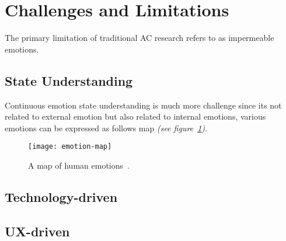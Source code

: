 \section{Challenges and Limitations}\label{sec:challenges}

The primary limitation of traditional AC research refers to as impermeable emotions.

\cite{Picard2003}

\subsection{State Understanding}

Continuous emotion state understanding is much more challenge since its not related to external emotion but also related to internal emotions, various emotions can be expressed as follows map \textit{(see figure~\ref{fig:emotions})}.

\begin{figure}[htb]
    \centering
    \texttt{[image: emotion-map]}
    \caption{A map of human emotions~\cite{emotionmap}.}
    \label{fig:emotions}
  \end{figure}
  

\subsection{Technology-driven}



\subsection{UX-driven}
